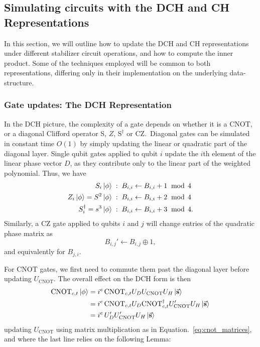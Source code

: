 \subsection{Simulating circuits with the DCH and CH Representations}\label{sec:dch_ch_methods}
In this section, we will outline how to update the DCH and CH representations under different stabilizer circuit operations, and how to compute the inner product. Some of the techniques employed will be common to both representations, differing only in their implementation on the underlying data-structure.
\subsubsection*{Gate updates: The DCH Representation}
In the DCH picture, the complexity of a gate depends on whether it is a CNOT, or a diagonal Clifford operator S, $Z$, $\text{S}^{\dagger}$ or CZ.\ Diagonal gates can be simulated in constant time $O(1)$ by simply updating the linear or quadratic part of the diagonal layer. Single qubit gates applied to qubit $i$ update the $i$th element of the linear phase vector $D$, as they contribute only to the linear part of the weighted polynomial. Thus, we have
\begin{align}
S_{i}\ket{\phi} &\;:\;B_{i,i}\leftarrow B_{i,i} + 1\;\bmod\,4 \\
Z_{i}\ket{\phi} = S^{2}\ket{\phi} &\;:\;B_{i,i}\leftarrow B_{i,i} +2\;\bmod\,4 \\
S_{i}^{\dagger} = s^{3}\ket{\phi} & \;:\;B_{i,i}\leftarrow B_{i,i} + 3\;\bmod\,4. 
\end{align}
Similarly, a CZ gate applied to qubits $i$ and $j$ will change entries of the quadratic phase matrix as
\begin{equation}
B_{i,j}' \leftarrow B_{i,j}\oplus 1,
\end{equation}
and equivalently for $B_{j,i}$.\par
For CNOT gates, we first need to commute them past the diagonal layer before updating $U_{\text{CNOT}}$. The overall effect on the DCH form is then
\begin{align}
\text{CNOT}_{c,t}\ket{\phi} &= i^{e}\,\text{CNOT}_{c,t}U_{D}U_{\text{CNOT}}U_{H} \ket{\va{s}}\nonumber \\
&= i^{e}\,\text{CNOT}_{c,t}U_{D}\text{CNOT}_{c,t}^{\dagger} U_{\text{CNOT}}' U_{H}\ket{\va{s}} \nonumber \\
&= i^{e}\,U_{D}'U_{\text{CNOT}}'U_{H}\ket{\va{s}}
\end{align}
updating $U_{\text{CNOT}}$ using matrix multiplication as in Equation.~\ref{eq:cnot_matrices}, and where the last line relies on the following Lemma:
